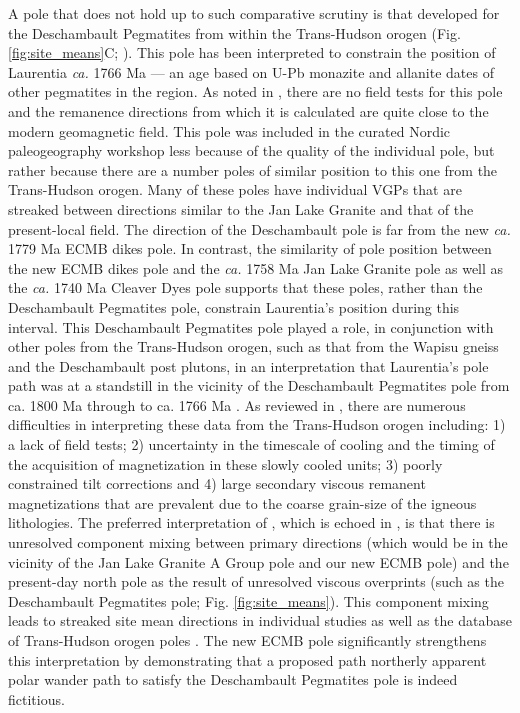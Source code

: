 \documentclass[draft]{agujournal2019}
\begin{document}
A pole that does not hold up to such comparative scrutiny is that developed for the Deschambault Pegmatites from within the Trans-Hudson orogen (Fig. \ref{fig:site_means}C; ).  This pole has been interpreted to constrain the position of Laurentia \textit{ca.} 1766 Ma --- an age based on U-Pb monazite and allanite dates of other pegmatites in the region. As noted in , there are no field tests for this pole and the remanence directions from which it is calculated are quite close to the modern geomagnetic field. This pole was included in the curated Nordic paleogeography workshop less because of the quality of the individual pole, but rather because there are a number poles of similar position to this one from the Trans-Hudson orogen. Many of these poles have individual VGPs that are streaked between directions similar to the Jan Lake Granite and that of the present-local field. The direction of the Deschambault pole is far from the new \textit{ca.} 1779 Ma ECMB dikes pole. In contrast, the similarity of pole position between the new ECMB dikes pole and the \textit{ca.} 1758 Ma Jan Lake Granite pole as well as the \textit{ca.} 1740 Ma Cleaver Dyes pole supports that these poles, rather than the Deschambault Pegmatites pole, constrain Laurentia's position during this interval. This Deschambault Pegmatites pole played a role, in conjunction with other poles from the Trans-Hudson orogen, such as that from the Wapisu gneiss and the Deschambault post plutons, in an interpretation that Laurentia's pole path was at a standstill in the vicinity of the Deschambault Pegmatites pole from ca. 1800 Ma through to ca. 1766 Ma \cite{Symons2000a, Symons2005a}. As reviewed in \cite{Raub2008a}, there are numerous difficulties in interpreting these data from the Trans-Hudson orogen including: 1) a lack of field tests; 2) uncertainty in the timescale of cooling and the timing of the acquisition of magnetization in these slowly cooled units; 3) poorly constrained tilt corrections and 4) large secondary viscous remanent magnetizations that are prevalent due to the coarse grain-size of the igneous lithologies. The preferred interpretation of , which is echoed in , is that there is unresolved component mixing between primary directions (which would be in the vicinity of the Jan Lake Granite A Group pole and our new ECMB pole) and the present-day north pole as the result of unresolved viscous overprints (such as the Deschambault Pegmatites pole; Fig. \ref{fig:site_means}). This component mixing leads to streaked site mean directions in individual studies as well as the database of Trans-Hudson orogen poles \cite{Raub2008a}. The new ECMB pole significantly strengthens this interpretation by demonstrating that a proposed path northerly apparent polar wander path to satisfy the Deschambault Pegmatites pole is indeed fictitious.
\end{document}
